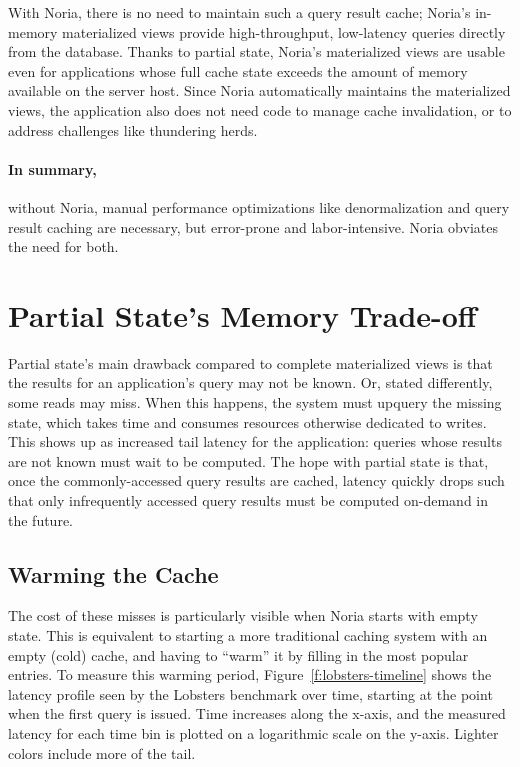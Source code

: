 With Noria, there is no need to maintain such a query result cache; Noria's
in-memory materialized views provide high-throughput, low-latency queries
directly from the database. Thanks to partial state, Noria's materialized views
are usable even for applications whose full cache state exceeds the amount of
memory available on the server host. Since Noria automatically maintains the
materialized views, the application also does not need code to manage cache
invalidation, or to address challenges like thundering herds.

\paragraph{In summary,} without Noria, manual performance optimizations like
denormalization and query result caching are necessary, but error-prone and
labor-intensive. Noria obviates the need for both.

\section{Partial State's Memory Trade-off}
\label{s:eval:cost}

Partial state's main drawback compared to complete materialized views is
that the results for an application's query may not be known. Or, stated
differently, some reads may miss. When this happens, the system must upquery the
missing state, which takes time and consumes resources otherwise dedicated to
writes. This shows up as increased tail latency for the application: queries
whose results are not known must wait to be computed. The hope with partial
state is that, once the commonly-accessed query results are cached, latency
quickly drops such that only infrequently accessed query results must be
computed on-demand in the future.

\subsection{Warming the Cache}

The cost of these misses is particularly visible when Noria starts with empty
state. This is equivalent to starting a more traditional caching system with an
empty (cold) cache, and having to ``warm'' it by filling in the most popular
entries. To measure this warming period, Figure~\vref{f:lobsters-timeline} shows
the latency profile seen by the Lobsters benchmark over time, starting at the
point when the first query is issued. Time increases along the x-axis, and the
measured latency for each time bin is plotted on a logarithmic scale on the
y-axis. Lighter colors include more of the tail.

